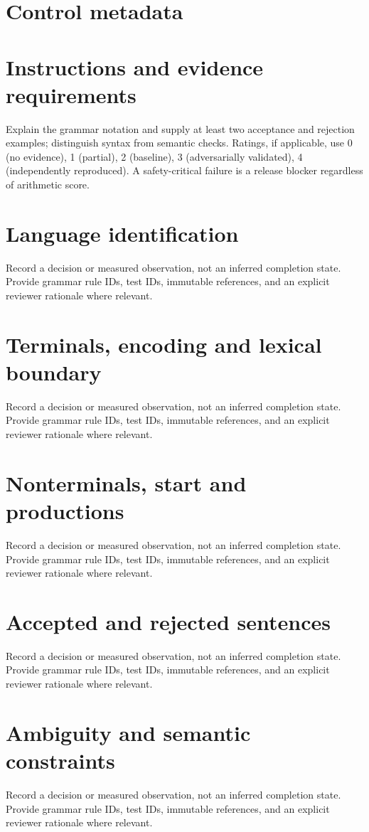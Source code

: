\documentclass[11pt,letterpaper]{article}
\begin{document}
\makedoctitle\makedocsummary
\tableofcontents\clearpage
\section{Control metadata}
\section{Instructions and evidence requirements}
Explain the grammar notation and supply at least two acceptance and rejection examples; distinguish syntax from semantic checks. Ratings, if applicable, use 0 (no evidence), 1 (partial), 2 (baseline), 3 (adversarially validated), 4 (independently reproduced). A safety-critical failure is a release blocker regardless of arithmetic score.
\section{Language identification}
Record a decision or measured observation, not an inferred completion state. Provide grammar rule IDs, test IDs, immutable references, and an explicit reviewer rationale where relevant.
\section{Terminals, encoding and lexical boundary}
Record a decision or measured observation, not an inferred completion state. Provide grammar rule IDs, test IDs, immutable references, and an explicit reviewer rationale where relevant.
\section{Nonterminals, start and productions}
Record a decision or measured observation, not an inferred completion state. Provide grammar rule IDs, test IDs, immutable references, and an explicit reviewer rationale where relevant.
\section{Accepted and rejected sentences}
Record a decision or measured observation, not an inferred completion state. Provide grammar rule IDs, test IDs, immutable references, and an explicit reviewer rationale where relevant.
\section{Ambiguity and semantic constraints}
Record a decision or measured observation, not an inferred completion state. Provide grammar rule IDs, test IDs, immutable references, and an explicit reviewer rationale where relevant.
\end{document}
